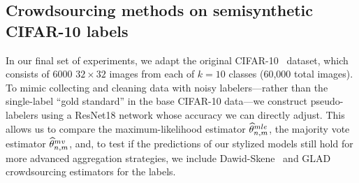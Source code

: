 \documentclass[11pt]{article}
\newcommand{\what}[1]{\widehat{#1}}
\newcommand{\lr}{^{\textup{lr}}}
\newcommand{\mv}{^{\textup{mv}}}
\newcommand{\<}{\langle} %
\renewcommand{\>}{\rangle}
\newcommand{\tmle}{\what{\theta}\lr_{n,m}} %
\newcommand{\mve}{\what{\theta}\mv_{n,m}} %
\begin{document}
\subsection{Crowdsourcing methods on semisynthetic CIFAR-10 labels} \label{sec:semi-synthetic}

In our final set of experiments, we adapt the original
CIFAR-10~\cite{KrizhevskyHi09} dataset, which consists of 6000 $32 \times
32$ images from each of $k = 10$ classes (60,000 total images).  To mimic
collecting and cleaning data with noisy labelers---rather than the
single-label ``gold standard'' in the base CIFAR-10 data---we construct
pseudo-labelers using a ResNet18 network whose accuracy we can directly
adjust. This allows us to compare the maximum-likelihood estimator
$\what{\theta}^{\textup{mle}}_{n,m}$, the majority vote estimator $\mve$,
and, to test if the predictions of our stylized models still hold
for more advanced aggregation strategies, we include
Dawid-Skene~\citep{DawidSk79} and GLAD~\citep{WhitehillWuBeMoRu09}
crowdsourcing estimators for the labels.


\newcommand{\softmax}{\textup{softmax}}
\end{document}
